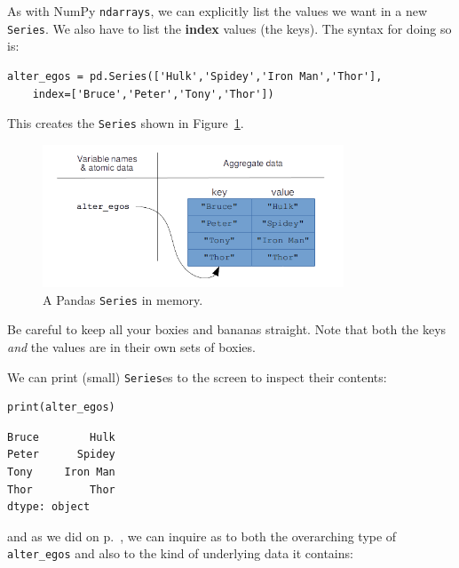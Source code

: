 As with NumPy \texttt{ndarrays}, we can explicitly list the values we want in a
new \texttt{Series}. We also have to list the \textbf{index} values (the keys).
The syntax for doing so is:

\begin{Verbatim}[fontsize=\small,samepage=true,frame=single,framesep=3mm]
alter_egos = pd.Series(['Hulk','Spidey','Iron Man','Thor'],
    index=['Bruce','Peter','Tony','Thor'])
\end{Verbatim}

This creates the \texttt{Series} shown in Figure~\ref{fig:Series}.

\begin{figure}[ht]
\centering
\includegraphics[width=0.8\textwidth]{Series.png}
\caption{A Pandas \texttt{Series} in memory.}
\label{fig:Series}
\end{figure}


Be careful to keep all your boxies and bananas straight. Note that both the
keys \textit{and} the values are in their own sets of boxies.

We can print (small) \texttt{Series}es to the screen to inspect their contents:

\begin{Verbatim}[fontsize=\small,samepage=true,frame=single,framesep=3mm]
print(alter_egos)
\end{Verbatim}

\begin{Verbatim}[fontsize=\small,samepage=true,frame=leftline,framesep=5mm,framerule=1mm]
Bruce        Hulk
Peter      Spidey
Tony     Iron Man
Thor         Thor
dtype: object
\end{Verbatim}

and as we did on p.~\pageref{arrayType}, we can inquire as to both the
overarching type of \texttt{alter\_egos} and also to the kind of underlying
data it contains:

